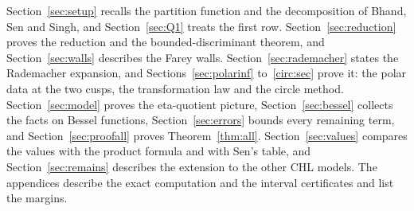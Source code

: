Section~\ref{sec:setup} recalls the partition function and the decomposition of Bhand, Sen and Singh, and Section~\ref{sec:Q1} treats the first row. Section~\ref{sec:reduction} proves the reduction and the bounded-discriminant theorem, and Section~\ref{sec:walls} describes the Farey walls. Section~\ref{sec:rademacher} states the Rademacher expansion, and Sections~\ref{sec:polarinf} to~\ref{circ:sec} prove it: the polar data at the two cusps, the transformation law and the circle method. Section~\ref{sec:model} proves the eta-quotient picture, Section~\ref{sec:bessel} collects the facts on Bessel functions, Section~\ref{sec:errors} bounds every remaining term, and Section~\ref{sec:proofall} proves Theorem~\ref{thm:all}. Section~\ref{sec:values} compares the values with the product formula and with Sen's table, and Section~\ref{sec:remains} describes the extension to the other CHL models. The appendices describe the exact computation and the interval certificates and list the margins.
